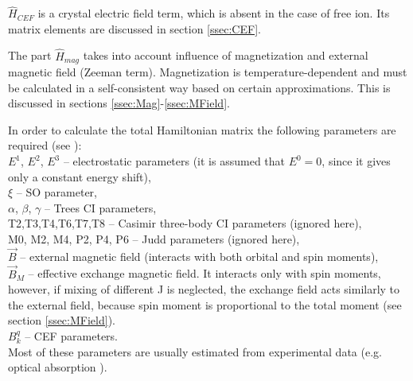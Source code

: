\documentclass[a4paper,oneside,12pt]{extarticle}
\begin{document}
$\hat{H}_{CEF}$ is a crystal electric field term, which is absent in the case of free ion. Its matrix elements are discussed in section \ref{ssec:CEF}.

The part $\hat{H}_{mag}$ takes into account influence of magnetization and external magnetic field (Zeeman term). Magnetization is temperature-dependent and must be calculated in a self-consistent way based on certain approximations. This is discussed in sections \ref{ssec:Mag}-\ref{ssec:MField}.

In order to calculate the total Hamiltonian matrix the following parameters are required (see \cite{Carnall_1989}):\\
$E^1$, $E^2$, $E^3$ -- electrostatic parameters (it is assumed that $E^0=0$, since it gives only a constant energy shift),\\
$\xi$ -- SO parameter,\\
$\alpha$, $\beta$, $\gamma$ -- Trees CI parameters,\\
T2,T3,T4,T6,T7,T8 -- Casimir three-body CI parameters (ignored here),\\
M0, M2, M4, P2, P4, P6 -- Judd parameters (ignored here),\\
$\vec{B}$ -- external magnetic field (interacts with both orbital and spin moments),\\
$\vec{B}_M$ -- effective exchange magnetic field.  It interacts only with spin moments, however, if mixing of different J is neglected, the exchange field acts similarly to the external field, because spin moment is proportional to the total moment (see section \ref{ssec:MField}).\\
$B_k^q$ -- CEF parameters.\\
Most of these parameters are usually estimated from experimental data (e.g. optical absorption \cite{Carnall_1989}).

\end{document}
